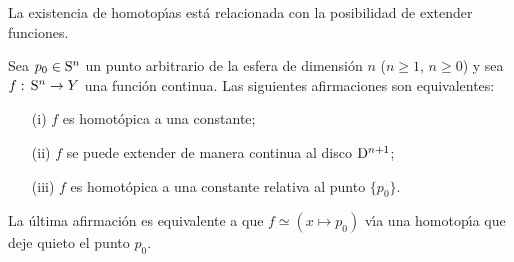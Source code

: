 La existencia de homotop\'{\i}as est\'{a} relacionada con la posibilidad de
extender funciones.

\begin{teoDeLaEsferaAlDisco}\label{thm:delaesferaaldisco}
	Sea $p_{0}\in\mathrm{S}^{n}$ un punto arbitrario de la esfera de
	dimensi\'{o}n $n$ ($n\geq 1$, $n\geq 0$) y sea
	$f:\,\mathrm{S}^{n}\rightarrow Y$ una funci\'{o}n continua. Las
	siguientes afirmaciones son equivalentes:
	\begin{itemize}
		\item[(i)] $f$ es homot\'{o}pica a una constante;
		\item[(ii)] $f$ se puede extender de manera continua al
			disco $\mathrm{D}^{n+1}$;
		\item[(iii)] $f$ es homot\'{o}pica a una constante relativa
			al punto $\{p_{0}\}$.
	\end{itemize}
\end{teoDeLaEsferaAlDisco}

La \'{u}ltima afirmaci\'{o}n es equivalente a que $f\simeq (x\mapsto p_{0})$
v\'{\i}a una homotop\'{\i}a que deje quieto el punto $p_{0}$.

